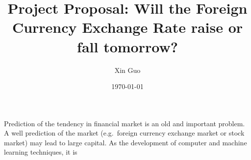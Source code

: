 \documentclass[12pt]{article}
\begin{document}
\title{Project Proposal: Will the Foreign Currency Exchange Rate raise or fall tomorrow?}
\author{Xin Guo}
\date{\today}
\maketitle

Prediction of the tendency in financial market is an old and important problem.  A well prediction of the market (e.g.\ foreign currency exchange market or stock market) may lead to large capital.  As the development of computer and machine learning techniques, it is 



%
%
%
%
%
%
%
\end{document}
